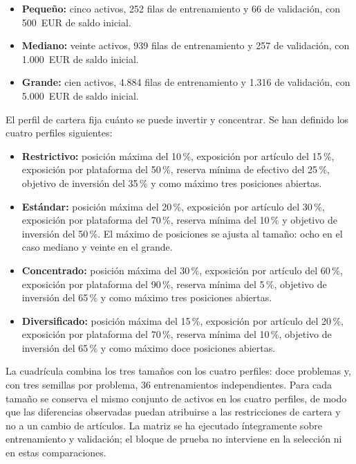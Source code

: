 \begin{itemize}
  \item \textbf{Pequeño:} cinco activos, 252 filas de entrenamiento y 66 de validación, con 500~EUR de saldo inicial.
  \item \textbf{Mediano:} veinte activos, 939 filas de entrenamiento y 257 de validación, con 1.000~EUR de saldo inicial.
  \item \textbf{Grande:} cien activos, 4.884 filas de entrenamiento y 1.316 de validación, con 5.000~EUR de saldo inicial.
\end{itemize}

El perfil de cartera fija cuánto se puede invertir y concentrar. Se han definido los cuatro perfiles siguientes:

\begin{itemize}
  \item \textbf{Restrictivo:} posición máxima del 10\,\%, exposición por artículo del 15\,\%, exposición por plataforma del 50\,\%, reserva mínima de efectivo del 25\,\%, objetivo de inversión del 35\,\% y como máximo tres posiciones abiertas.
  \item \textbf{Estándar:} posición máxima del 20\,\%, exposición por artículo del 30\,\%, exposición por plataforma del 70\,\%, reserva mínima del 10\,\% y objetivo de inversión del 50\,\%. El máximo de posiciones se ajusta al tamaño: ocho en el caso mediano y veinte en el grande.
  \item \textbf{Concentrado:} posición máxima del 30\,\%, exposición por artículo del 60\,\%, exposición por plataforma del 90\,\%, reserva mínima del 5\,\%, objetivo de inversión del 65\,\% y como máximo tres posiciones abiertas.
  \item \textbf{Diversificado:} posición máxima del 15\,\%, exposición por artículo del 20\,\%, exposición por plataforma del 70\,\%, reserva mínima del 10\,\%, objetivo de inversión del 65\,\% y como máximo doce posiciones abiertas.
\end{itemize}

La cuadrícula combina los tres tamaños con los cuatro perfiles: doce problemas y, con tres semillas por problema, 36 entrenamientos independientes. Para cada tamaño se conserva el mismo conjunto de activos en los cuatro perfiles, de modo que las diferencias observadas puedan atribuirse a las restricciones de cartera y no a un cambio de artículos. La matriz se ha ejecutado íntegramente sobre entrenamiento y validación; el bloque de prueba no interviene en la selección ni en estas comparaciones.

